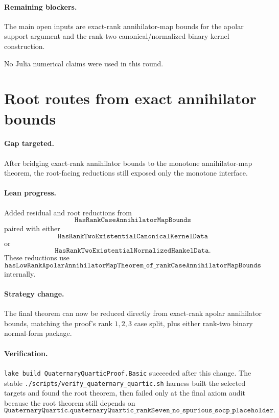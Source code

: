 \documentclass[11pt]{article}
\begin{document}
\paragraph{Remaining blockers.}
The main open inputs are exact-rank annihilator-map bounds for the apolar
support argument and the rank-two canonical/normalized binary kernel
construction.

No Julia numerical claims were used in this round.

\section*{Root routes from exact annihilator bounds}

\paragraph{Gap targeted.}
After bridging exact-rank annihilator bounds to the monotone annihilator-map
theorem, the root-facing reductions still exposed only the monotone interface.

\paragraph{Lean progress.}
Added residual and root reductions from
\[
\texttt{HasRankCaseAnnihilatorMapBounds}
\]
paired with either
\[
\texttt{HasRankTwoExistentialCanonicalKernelData}
\]
or
\[
\texttt{HasRankTwoExistentialNormalizedHankelData}.
\]
These reductions use
\[
\texttt{hasLowRankApolarAnnihilatorMapTheorem\_of\_rankCaseAnnihilatorMapBounds}
\]
internally.

\paragraph{Strategy change.}
The final theorem can now be reduced directly from exact-rank apolar
annihilator bounds, matching the proof's rank \(1,2,3\) case split, plus either
rank-two binary normal-form package.

\paragraph{Verification.}
\texttt{lake build QuaternaryQuarticProof.Basic} succeeded after this change.
The stable \texttt{./scripts/verify\_quaternary\_quartic.sh} harness built the
selected targets and found the root theorem, then failed only at the final axiom
audit because the root theorem still depends on
\[
\texttt{QuaternaryQuartic.quaternaryQuartic\_rankSeven\_no\_spurious\_socp\_placeholder}.
\]
\end{document}
